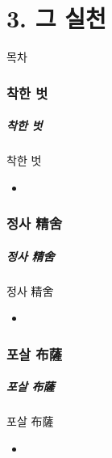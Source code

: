 \documentclass[aspectratio=1610,17pt,xcolor=pdftex,dvipsnames,table,handout]{beamer}
\begin{document}
		\part{ 3. 그 실천 }
		\frame{\partpage}

		\begin{frame} [plain]{목차}
		\tableofcontents%
		\end{frame}


		\section{				착한 벗	}
		\begin{frame} [t,plain]					
		\frametitle{			착한 벗	}
			\begin{block} { 		착한 벗	}
			\setlength{\leftmargini}{2em}			
			\begin{itemize}
				\item 
			\end{itemize}
			\end{block}						
								
		\end{frame}						


		\section{				정사	精舍	}
		\begin{frame} [t,plain]						
		\frametitle{			정사	精舍	}
			\begin{block} { 		정사	精舍	}
			\setlength{\leftmargini}{2em}			
			\begin{itemize}
				\item 
			\end{itemize}
			\end{block}						
								
		\end{frame}						

		\section{				포살	布薩	}
		\begin{frame} [t,plain]						
		\frametitle{			포살	布薩	}
			\begin{block} { 		포살	布薩	}
			\setlength{\leftmargini}{2em}			
			\begin{itemize}
				\item 
			\end{itemize}
			\end{block}						
								
		\end{frame}						
\end{document}

